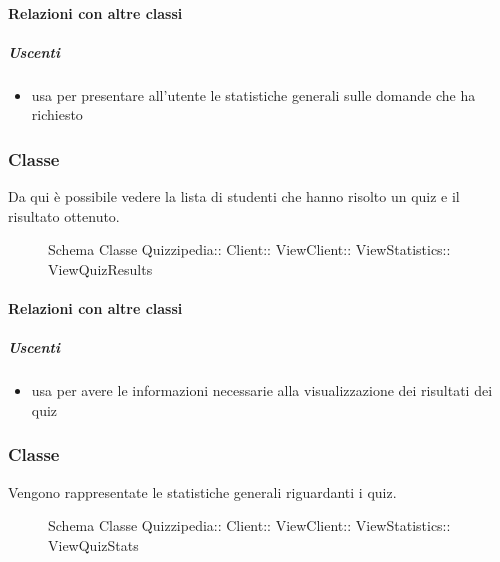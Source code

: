 \paragraph{Relazioni con altre classi}
\subparagraph{Uscenti}
\begin{itemize}
\item usa  per presentare all'utente le statistiche generali sulle domande che ha richiesto
\end{itemize}
\subsubsection{Classe }
Da qui è possibile vedere la lista di studenti che hanno risolto un quiz e il risultato ottenuto.
\begin{figure}[H]
\centering
\noindent{}
\caption[Schema Classe ViewQuizResults]{Schema Classe Quizzipedia:: Client:: ViewClient:: ViewStatistics:: ViewQuizResults}
\end{figure}
\paragraph{Relazioni con altre classi}
\subparagraph{Uscenti}
\begin{itemize}
\item usa  per avere le informazioni necessarie alla visualizzazione dei risultati dei quiz
\end{itemize}
\subsubsection{Classe }
Vengono rappresentate le statistiche generali riguardanti i quiz.
\begin{figure}[H]
\centering
\noindent{}
\caption[Schema Classe ViewQuizStats]{Schema Classe Quizzipedia:: Client:: ViewClient:: ViewStatistics:: ViewQuizStats}
\end{figure}
